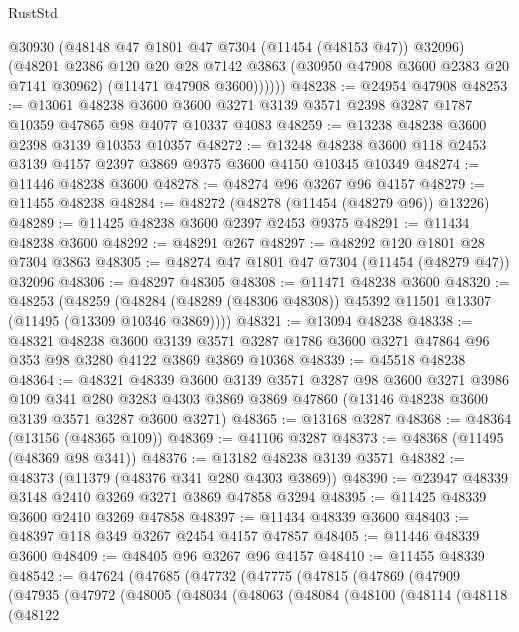 \begin{lexlean}{RustStd}
\begin{coremodule}
            @30930
            (@48148 @47 @1801 @47 @7304 (@11454 (@48153 @47)) @32096)
            (@48201
              @2386
              @120
              @20
              @28
              @7142
              @3863
              (@30950 @47908 @3600 @2383 @20 @7141 @30962)
              (@11471 @47908 @3600))))))
@48238 := @24954 @47908
@48253 := @13061
    @48238
    @3600
    @3600
    @3271
    @3139
    @3571
    @2398
    @3287
    @1787
    @10359
    @47865
    @98
    @4077
    @10337
    @4083
@48259 := @13238 @48238 @3600 @2398 @3139 @10353 @10357
@48272 := @13248 @48238 @3600 @118 @2453 @3139 @4157 @2397 @3869 @9375 @3600 @4150 @10345 @10349
@48274 := @11446 @48238 @3600
@48278 := @48274 @96 @3267 @96 @4157
@48279 := @11455 @48238
@48284 := @48272 (@48278 (@11454 (@48279 @96)) @13226)
@48289 := @11425 @48238 @3600 @2397 @2453 @9375
@48291 := @11434 @48238 @3600
@48292 := @48291 @267
@48297 := @48292 @120 @1801 @28 @7304 @3863
@48305 := @48274 @47 @1801 @47 @7304 (@11454 (@48279 @47)) @32096
@48306 := @48297 @48305
@48308 := @11471 @48238 @3600
@48320 := @48253
    (@48259 (@48284 (@48289 (@48306 @48308)) @45392 @11501 @13307 (@11495 (@13309 @10346 @3869))))
@48321 := @13094 @48238
@48338 := @48321
    @48238
    @3600
    @3139
    @3571
    @3287
    @1786
    @3600
    @3271
    @47864
    @96
    @353
    @98
    @3280
    @4122
    @3869
    @3869
    @10368
@48339 := @45518 @48238
@48364 := @48321
    @48339
    @3600
    @3139
    @3571
    @3287
    @98
    @3600
    @3271
    @3986
    @109
    @341
    @280
    @3283
    @4303
    @3869
    @3869
    @47860
    (@13146 @48238 @3600 @3139 @3571 @3287 @3600 @3271)
@48365 := @13168 @3287
@48368 := @48364 (@13156 (@48365 @109))
@48369 := @41106 @3287
@48373 := @48368 (@11495 (@48369 @98 @341))
@48376 := @13182 @48238 @3139 @3571
@48382 := @48373 (@11379 (@48376 @341 @280 @4303 @3869))
@48390 := @23947 @48339 @3148 @2410 @3269 @3271 @3869 @47858 @3294
@48395 := @11425 @48339 @3600 @2410 @3269 @47858
@48397 := @11434 @48339 @3600
@48403 := @48397 @118 @349 @3267 @2454 @4157 @47857
@48405 := @11446 @48339 @3600
@48409 := @48405 @96 @3267 @96 @4157
@48410 := @11455 @48339
@48542 := @47624
    (@47685
      (@47732
        (@47775
          (@47815
            (@47869
              (@47909
                (@47935
                  (@47972
                    (@48005
                      (@48034
                        (@48063
                          (@48084
                            (@48100
                              (@48114
                                (@48118
                                  (@48122

\end{coremodule}
\end{lexlean}
